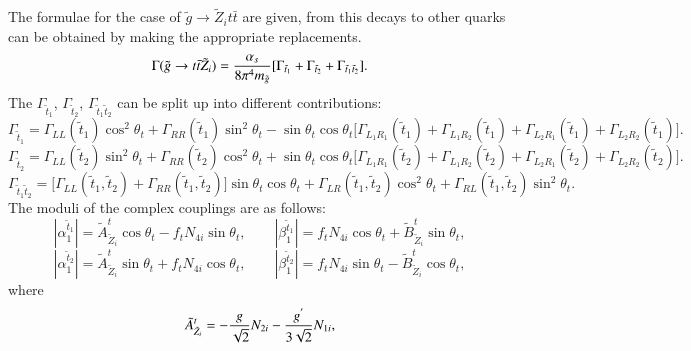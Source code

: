 \documentclass[final,3p,times,pdflatex]{elsarticle}
\begin{document}
The formulae for the case of $\tilde{g} \rightarrow \tilde{Z}_i t \bar{t}$ are given, from this decays to other quarks can be obtained by making the appropriate replacements.
\begin{equation} \label{gttneut}
\Gamma(\tilde{g} \rightarrow t \bar{t} \tilde{Z}_i) = {\alpha_s \over 8\pi^4 m_{\tilde{g}}}[\Gamma_{\tilde{t}_1} + \Gamma_{\tilde{t}_2} + \Gamma_{\tilde{t}_{1} \tilde{t}_{2}}].
\end{equation}
The $\Gamma_{\tilde{t}_1}$, $\Gamma_{\tilde{t}_2}$, $\Gamma_{\tilde{t}_1 \tilde{t}_2}$ can be split up into different contributions:
\begin{equation}
\Gamma_{\tilde{t}_1} = \Gamma_{LL}(\tilde{t}_1)\cos^2 \theta_t + \Gamma_{RR}(\tilde{t}_1)\sin^2 \theta_t - \sin\theta_t \cos \theta_t \Big[\Gamma_{L_{1} R_{1}} (\tilde{t}_1) + \Gamma_{L_{1} R_{2}} (\tilde{t}_1) + \Gamma_{L_{2} R_{1}} (\tilde{t}_1) + \Gamma_{L_{2} R_{2}} (\tilde{t}_1)\Big].
\end{equation}
\begin{equation}
\Gamma_{\tilde{t}_2} = \Gamma_{LL}(\tilde{t}_2)\sin^2 \theta_t + \Gamma_{RR}(\tilde{t}_2)\cos^2 \theta_t + \sin\theta_t \cos \theta_t \Big[\Gamma_{L_{1} R_{1}} (\tilde{t}_2) + \Gamma_{L_{1} R_{2}} (\tilde{t}_2) + \Gamma_{L_{2} R_{1}} (\tilde{t}_2) + \Gamma_{L_{2} R_{2}} (\tilde{t}_2)\Big].
\end{equation}
\begin{equation}
\Gamma_{\tilde{t}_{1} \tilde{t}_{2}} = \Big[\Gamma_{LL}(\tilde{t}_{1}, \tilde{t}_{2}) + \Gamma_{RR}(\tilde{t}_{1}, \tilde{t}_{2})\Big]\sin\theta_t \cos\theta_t + \Gamma_{LR}(\tilde{t}_1 , \tilde{t}_2) \cos^2 \theta_t + \Gamma_{RL}(\tilde{t}_1 , \tilde{t}_2) \sin^2 \theta_t.
\end{equation}
The moduli of the complex couplings are as follows:
\begin{equation}
|\alpha_{1}^{\tilde{t}_1}| = \tilde{A}^{t}_{\tilde{Z}_{i}} \cos\theta_t - f_{t}N_{4i} \sin\theta_t, \quad \quad |\beta_{1}^{\tilde{t}_1}| = f_{t}N_{4i}\cos\theta_t + \tilde{B}^{t}_{\tilde{Z}_{i}}\sin\theta_t,
\end{equation}
\begin{equation}
|\alpha_{1}^{\tilde{t}_2}| = \tilde{A}^{t}_{\tilde{Z}_i} \sin\theta_t + f_{t}N_{4i}\cos\theta_t, \quad \quad |\beta_{1}^{\tilde{t}_2}| = f_{t}N_{4i}\sin\theta_t - \tilde{B}^{t}_{\tilde{Z}_i}\cos\theta_t,
\end{equation}
where
\begin{equation} 
\tilde{A}^{t}_{\tilde{Z}_i} = -{g \over \sqrt{2}}N_{2i} - {g^{'} \over 3 \sqrt{2}}N_{1i},
\end{equation}
\end{document}
